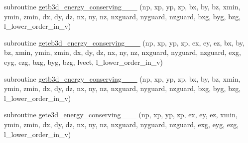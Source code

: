 \begin{DoxyCompactItemize}
\item 
subroutine \hyperlink{field__gathering_8_f90_a7ba87c0bcb5818f003a2d33921b5e40d}{getb3d\+\_\+energy\+\_\+conserving\+\_\+\_\+\_} (np, xp, yp, zp, bx, by, bz, xmin, ymin, zmin,                                                                                                                                                           dx, dy, dz, nx, ny, nz, nxguard, nyguard, nzguard,                                                                                                                                                   bxg, byg, bzg, l\+\_\+lower\+\_\+order\+\_\+in\+\_\+v)
\item 
subroutine \hyperlink{field__gathering_8_f90_ad43c0d4f9417aa987d3ca7f033ef6e69}{geteb3d\+\_\+energy\+\_\+conserving\+\_\+\_\+\_} (np, xp, yp, zp, ex, ey, ez, bx, by, bz, xmin, ymin, zmin,                                                                                                                                                           dx, dy, dz, nx, ny, nz, nxguard, nyguard, nzguard,                                                                                                                                                   exg, eyg, ezg, bxg, byg, bzg, lvect, l\+\_\+lower\+\_\+order\+\_\+in\+\_\+v)
\item 
subroutine \hyperlink{field__gathering_8_f90_aaa9c36b2c9467ccd77152e8a92ecfabe}{getb3d\+\_\+energy\+\_\+conserving\+\_\+\_\+\_} (np, xp, yp, zp, bx, by, bz, xmin, ymin, zmin,                                                                                                                                                                           dx, dy, dz, nx, ny, nz, nxguard, nyguard, nzguard,                                                                                                                                                   bxg, byg, bzg, l\+\_\+lower\+\_\+order\+\_\+in\+\_\+v)
\item 
subroutine \hyperlink{field__gathering_8_f90_a4bc4ddba4b00ad2b51022fd9ce43c128}{gete3d\+\_\+energy\+\_\+conserving\+\_\+\_\+\_} (np, xp, yp, zp, ex, ey, ez, xmin, ymin, zmin,                                                                                                                                                                           dx, dy, dz, nx, ny, nz, nxguard, nyguard, nzguard,                                                                                                                                                   exg, eyg, ezg, l\+\_\+lower\+\_\+order\+\_\+in\+\_\+v)

\end{DoxyCompactItemize}
